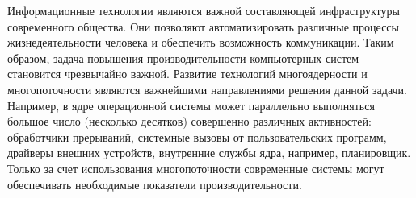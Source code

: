 
{\actuality} Информационные технологии являются важной составляющей инфраструктуры современного общества.
Они позволяют автоматизировать различные процессы жизнедеятельности человека и обеспечить возможность коммуникации.
Таким образом, задача повышения производительности компьютерных систем становится чрезвычайно важной.
Развитие технологий многоядерности и многопоточности являются важнейшими направлениями решения данной задачи.
Например, в ядре операционной системы может параллельно выполняться большое число (несколько десятков) совершенно различных активностей: обработчики прерываний, системные вызовы от пользовательских программ, драйверы внешних устройств, внутренние службы ядра, например, планировщик.
Только за счет использования многопоточности современные системы могут обеспечивать необходимые показатели производительности.
%


